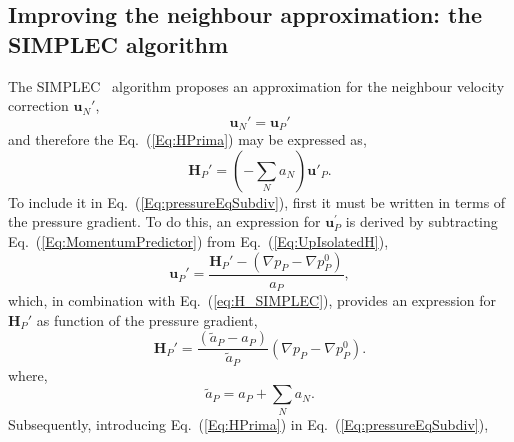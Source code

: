 \documentclass[final,3p,times,11pt,onecolumn]{myElsarticle}
\numberwithin{equation}{section}
\begin{document}

\subsection{Improving the neighbour approximation: the SIMPLEC algorithm}
The SIMPLEC~\cite{vanDoormal} algorithm proposes an approximation for the neighbour velocity correction $\boldsymbol{u}_N'$,
\begin{equation}
\label{Eq:simplecAproximation}
\boldsymbol{u}_N'
=
\boldsymbol{u}_P'
\end{equation}
and therefore the Eq.~(\ref{Eq:HPrima}) may be expressed as,
\begin{equation}
\label{eq:H_SIMPLEC}
\boldsymbol{H}_P'= \left(-\sum_N a_N\right) \boldsymbol{u}'_P.
\end{equation}
To include it in Eq.~(\ref{Eq:pressureEqSubdiv}), first it must be written in terms of the pressure gradient. To do this, an expression for $\boldsymbol{u}_P^{'}$ is derived by subtracting Eq.~(\ref{Eq:MomentumPredictor}) from Eq.~(\ref{Eq:UpIsolatedH}),
\begin{equation}
\label{Eq:UPrimaIsolated}
\boldsymbol{u}_P'
=
\dfrac
{
\boldsymbol{H}_P'
- 
\left(
\nabla p_P
-
\nabla p_P^{0}
\right)
}
{a_P},
\end{equation}
which, in combination with Eq.~(\ref{eq:H_SIMPLEC}), provides an expression for $\boldsymbol{H}_P'$ as function of the pressure gradient,
\begin{equation}
\label{Eq:HPrima2}
\boldsymbol{H}_P'
= 
\dfrac
{
\left(
\tilde{a}_P
-
a_P
\right)
}
{
\tilde{a}_P
}
\left(
\nabla p_P
-
\nabla p_P^{0}
\right).
\end{equation}
where,
\begin{equation}
\tilde{a}_P
=
a_P + \sum_{N} a_{N}.
\end{equation}
Subsequently, introducing Eq.~(\ref{Eq:HPrima}) in Eq.~(\ref{Eq:pressureEqSubdiv}),
\end{document}
